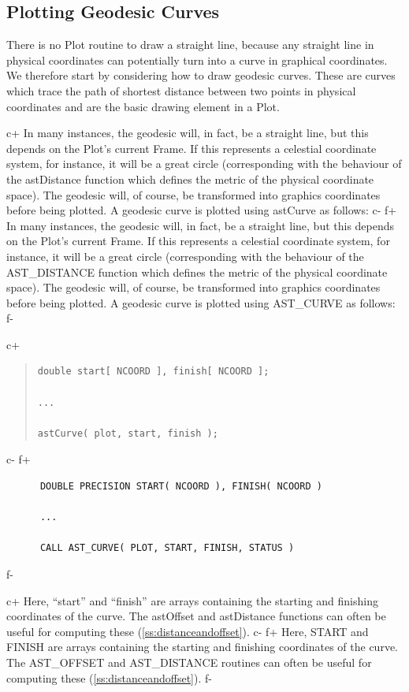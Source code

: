 \documentclass[twoside,11pt]{article}
\newcommand{\secref}[1]{\S\ref{#1}}
\renewcommand{\secref}[1]{\ref{#1}}
\begin{document}
\subsection{\label{ss:plottinggeodesics}Plotting Geodesic Curves}

There is no Plot routine to draw a straight line, because any straight
line in physical coordinates can potentially turn into a curve in
graphical coordinates. We therefore start by considering how to draw
geodesic curves.  These are curves which trace the path of shortest
distance between two points in physical coordinates
 and are the basic drawing element in a Plot. 

c+
In many instances, the geodesic will, in fact, be a straight line, but
this depends on the Plot's current Frame. If this represents a
celestial coordinate system, for instance, it will be a great circle
(corresponding with the behaviour of the astDistance function which
defines the metric of the physical coordinate space).  The geodesic
will, of course, be transformed into graphics coordinates before being
plotted. A geodesic curve is plotted using astCurve as follows:
c-
f+
In many instances, the geodesic will, in fact, be a straight line, but
this depends on the Plot's current Frame. If this represents a
celestial coordinate system, for instance, it will be a great circle
(corresponding with the behaviour of the AST\_DISTANCE function which
defines the metric of the physical coordinate space).  The geodesic
will, of course, be transformed into graphics coordinates before being
plotted. A geodesic curve is plotted using AST\_CURVE as follows:
f-

c+
\begin{quote}
\small
\begin{verbatim}
double start[ NCOORD ], finish[ NCOORD ];

...

astCurve( plot, start, finish );
\end{verbatim}
\normalsize
\end{quote}
c-
f+
\small
\begin{verbatim}
      DOUBLE PRECISION START( NCOORD ), FINISH( NCOORD )

      ...

      CALL AST_CURVE( PLOT, START, FINISH, STATUS )
\end{verbatim}
\normalsize
f-

c+
Here, ``start'' and ``finish'' are arrays containing the starting and
finishing coordinates of the curve. The astOffset and astDistance
functions can often be useful for computing these
(\secref{ss:distanceandoffset}).
c-
f+
Here, START and FINISH are arrays containing the starting and
finishing coordinates of the curve. The AST\_OFFSET and AST\_DISTANCE
routines can often be useful for computing these
(\secref{ss:distanceandoffset}).
f-
\end{document}
